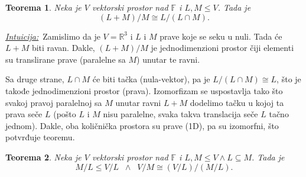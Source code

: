 \documentclass[a4paper,12pt,twoside]{report}
\newtheorem{theorem}{Teorema}[section]
\numberwithin{algorithm}{section}
\newcommand{\intuicija}{\noindent\underline{\textit{Intuicija:}}\ }
\begin{document}
\begin{figure}[!h]
\end{figure}
\vfill
\begin{theorem}
    Neka je $V$ vektorski prostor nad $\mathbb{F}$ i $L, M \leq V$. Tada je
    \[ (L + M)/M \cong L/(L\cap M). \]
\end{theorem}
\intuicija Zamislimo da je $V = \mathbb{R}^3$ i $L$ i $M$ prave koje se seku u nuli. Tada će $L + M$ biti ravan. Dakle, $(L + M)/M$ je jednodimenzioni prostor čiji elementi su translirane prave (paralelne sa $M$) unutar te ravni.

Sa druge strane, $L \cap M$ će biti tačka (nula-vektor), pa je $L/(L\cap M) \cong L$, što je takođe jednodimenzioni prostor (prava). Izomorfizam se uspostavlja tako što svakoj pravoj paralelnoj sa $M$ unutar ravni $L+M$ dodelimo tačku u kojoj ta prava seče $L$ (pošto $L$ i $M$ nisu paralelne, svaka takva translacija seče $L$ tačno jednom). Dakle, oba količnička prostora su prave (1D), pa su izomorfni, što potvrđuje teoremu.
\vfill
\newpage

\begin{theorem}
    Neka je $V$ vektorski prostor nad $\mathbb{F}$ i $L, M \leq V \land L \subseteq M$. Tada je
    \[ M/L \leq V/L \;\;\land\;\; V/M \cong (V/L)\big/ (M/L). \]
\end{theorem}
\end{document}
